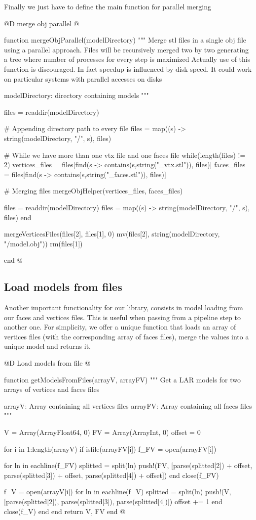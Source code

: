 \documentclass[11pt,oneside]{article}	%
\begin{document}
Finally we just have to define the main function for parallel merging 

@D merge obj parallel
@{function mergeObjParallel(modelDirectory)
  """
  Merge stl files in a single obj file using a parallel
  approach. Files will be recursively merged two by two
  generating a tree where number of processes for every
  step is maximized
  Actually use of this function is discouraged. In fact
  speedup is influenced by disk speed. It could work on
  particular systems with parallel accesses on disks

  modelDirectory: directory containing models
  """

  files = readdir(modelDirectory)

  # Appending directory path to every file
  files = map((s) -> string(modelDirectory, "/", s), files)

  # While we have more than one vtx file and one faces file
  while(length(files) != 2)
    vertices_files = files[find(s -> contains(s,string("_vtx.stl")), files)]
    faces_files = files[find(s -> contains(s,string("_faces.stl")), files)]

    # Merging files
    mergeObjHelper(vertices_files, faces_files)

    files = readdir(modelDirectory)
    files = map((s) -> string(modelDirectory, "/", s), files)
  end

  mergeVerticesFiles(files[2], files[1], 0)
  mv(files[2], string(modelDirectory, "/model.obj"))
  rm(files[1])

end @}

\subsection{Load models from files}\label{sec:loadObj}

Another important functionality for our library, consists in model loading from our faces and vertices files. This is useful when passing from a pipeline step to another one. For simplicity, we offer a unique function that loads an array of vertices files (with the corresponding array of faces files), merge the values into a unique model and returns it.

@D Load models from file
@{function getModelsFromFiles(arrayV, arrayFV)
  """
  Get a LAR models for two arrays of vertices
  and faces files

  arrayV: Array containing all vertices files
  arrayFV: Array containing all faces files
  """

  V = Array(Array{Float64}, 0)
  FV = Array(Array{Int}, 0)
  offset = 0

  for i in 1:length(arrayV)
    if isfile(arrayFV[i])
      f_FV = open(arrayFV[i])

      for ln in eachline(f_FV)
        splitted = split(ln)
        push!(FV, [parse(splitted[2]) + offset, parse(splitted[3]) + offset, 
              parse(splitted[4]) + offset])
      end
      close(f_FV)

      f_V = open(arrayV[i])
      for ln in eachline(f_V)
        splitted = split(ln)
        push!(V, [parse(splitted[2]), parse(splitted[3]),
             parse(splitted[4])])
        offset += 1
      end
      close(f_V)
    end
  end
  return V, FV
end @}
\end{document}
